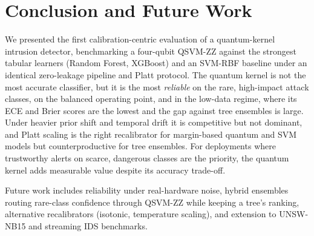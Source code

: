 \documentclass[journal]{IEEEtran}
\newcommand{\ZZ}{\textsc{ZZ}}
\newcommand{\QSVM}{QSVM-\ZZ}
\begin{document}
\section{Conclusion and Future Work}\label{sec:conclusion}
We presented the first calibration-centric evaluation of a quantum-kernel
intrusion detector, benchmarking a four-qubit \QSVM{} against the
strongest tabular learners (Random Forest, XGBoost) and an SVM-RBF
baseline under an identical zero-leakage pipeline and Platt protocol. The
quantum kernel is not the most accurate classifier, but it is the most
\emph{reliable} on the rare, high-impact attack classes, on the balanced
operating point, and in the low-data regime, where its ECE and Brier
scores are the lowest and the gap against tree ensembles is large. Under
heavier prior shift and temporal drift it is competitive but not
dominant, and Platt scaling is the right recalibrator for margin-based
quantum and SVM models but counterproductive for tree ensembles. For
deployments where trustworthy alerts on scarce, dangerous classes are the
priority, the quantum kernel adds measurable value despite its accuracy
trade-off.

Future work includes reliability under real-hardware noise, hybrid
ensembles routing rare-class confidence through \QSVM{} while keeping a
tree's ranking, alternative recalibrators (isotonic, temperature
scaling), and extension to UNSW-NB15 and streaming IDS benchmarks.
\end{document}
